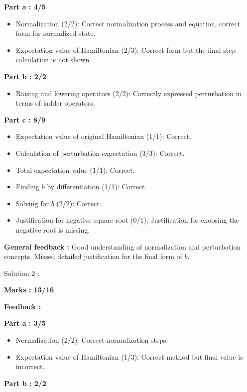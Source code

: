 \documentclass[a4paper,11pt]{article}
\begin{document}
\textbf{Part a : 4/5}

\begin{itemize}
    \item Normalization (2/2): Correct normalization process and equation, correct form for normalized state.
    \item Expectation value of Hamiltonian (2/3): Correct form but the final step calculation is not shown.
\end{itemize}

\textbf{Part b : 2/2}

\begin{itemize}
    \item Raising and lowering operators (2/2): Correctly expressed perturbation in terms of ladder operators.
\end{itemize}

\textbf{Part c : 8/9}

\begin{itemize}
    \item Expectation value of original Hamiltonian (1/1): Correct.
    \item Calculation of perturbation expectation (3/3): Correct.
    \item Total expectation value (1/1): Correct.
    \item Finding $b$ by differentiation (1/1): Correct.
    \item Solving for $b$ (2/2): Correct.
    \item Justification for negative square root (0/1): Justification for choosing the negative root is missing.
\end{itemize}

\textbf{General feedback :}
Good understanding of normalization and perturbation concepts. Missed detailed justification for the final form of $b$.

Solution 2 :

\textbf{Marks : 13/16}

\textbf{Feedback :}

\textbf{Part a : 3/5}

\begin{itemize}
    \item Normalization (2/2): Correct normalization steps.
    \item Expectation value of Hamiltonian (1/3): Correct method but final value is incorrect.
\end{itemize}

\textbf{Part b : 2/2}
\end{document}
